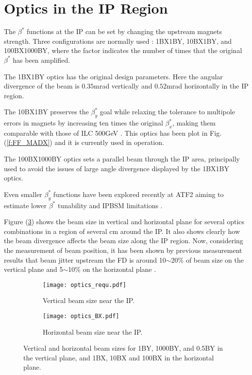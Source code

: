 \section{Optics in the IP Region}
The $\beta^*$ functions at the IP can be set by changing the upstream magnets strength. Three configurations are normally used : 1BX1BY, 10BX1BY, and 100BX1000BY, where the factor indicates the number of times that the original $\beta^*$ has been amplified.\par
The 1BX1BY optics has the original design parameters. Here the angular divergence of the beam is $0.35$mrad vertically and $0.52$mrad horizontally in the IP region. \par
The 10BX1BY preserves the $\beta_y^*$ goal while relaxing the tolerance to multipole errors in magnets by increasing ten times the original $\beta_x^*$, making them comparable with those of ILC 500GeV \cite{PhysRevSTAB.17.023501}. This optics has been plot in Fig. (\ref{f:FF_MADX}) and it is currently used in operation.\par
The 100BX1000BY optics sets a parallel beam through the IP area, principally used to avoid the issues of large angle divergence displayed by the 1BX1BY optics.\par
Even smaller $\beta_y^*$ functions have been explored recently at ATF2 aiming to estimate lower $\beta^*$ tunability and IPBSM limitations \cite{PateckiLowBeta}.\par
Figure (\ref{f:BXYoptics}) shows the beam size in vertical and horizontal plane for several optics combinations in a region of several cm around the IP. It also shows clearly how the beam divergence affects the beam size along the IP region. Now, considering the measurement of beam position, it has been shown by previous measurement results that beam jitter upstream the FD is around 10$\sim$20\% of beam size on the vertical plane and 5$\sim$10\% on the horizontal plane \cite{PateckiJitter}. 
\begin{figure}[htb]
 \begin{center}
 \hspace*{-1cm}
 \begin{subfigure}[b]{0.45\textwidth}
  \texttt{[image: optics\_requ.pdf]}\caption{Vertical beam size near the IP.}\label{f:opticsBY}
 \end{subfigure}\hspace{0.5cm}
\begin{subfigure}[b]{0.45\textwidth}
  \texttt{[image: optics\_BX.pdf]}\caption{Horizontal beam size near the IP.}\label{f:opticsBX}
 \end{subfigure}
  \caption{Vertical and horizontal beam sizes for 1BY, 1000BY, and 0.5BY in the vertical plane, and 1BX, 10BX and 100BX in the horizontal plane.}\label{f:BXYoptics}
 \end{center}
\end{figure}
